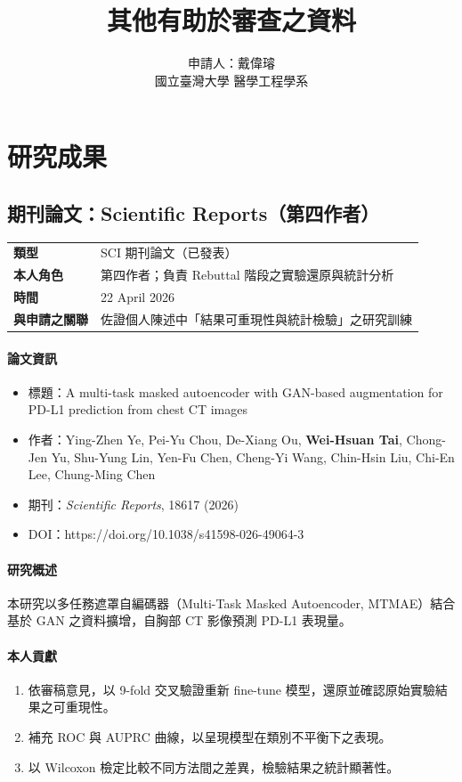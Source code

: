 \documentclass[12pt,a4paper]{article}
\title{\textbf{其他有助於審查之資料}\\[0.5em]}
\author{申請人：戴偉璿\\
國立臺灣大學 醫學工程學系}
\date{}
\newcommand{\itemsummary}[4]{%
\begin{center}
\begin{tabularx}{\linewidth}{>{\bfseries}l X}
\toprule
類型 & #1 \\
本人角色 & #2 \\
時間 & #3 \\
與申請之關聯 & #4 \\
\bottomrule
\end{tabularx}
\end{center}
}
\begin{document}
\maketitle
\thispagestyle{empty}

\newpage
\tableofcontents
\newpage

\section{研究成果}

\subsection{期刊論文：Scientific Reports（第四作者）}

\itemsummary
{SCI 期刊論文（已發表）}
{第四作者；負責 Rebuttal 階段之實驗還原與統計分析}
{22 April 2026}
{佐證個人陳述中「結果可重現性與統計檢驗」之研究訓練}

\paragraph{論文資訊}
\begin{itemize}[leftmargin=2em]
  \item 標題：A multi-task masked autoencoder with GAN-based augmentation for PD-L1 prediction from chest CT images
  \item 作者：Ying-Zhen Ye, Pei-Yu Chou, De-Xiang Ou, \textbf{Wei-Hsuan Tai}, Chong-Jen Yu, Shu-Yung Lin, Yen-Fu Chen, Cheng-Yi Wang, Chin-Hsin Liu, Chi-En Lee,  Chung-Ming Chen 
  \item 期刊：\textit{Scientific Reports}, 18617 (2026) 
  \item DOI：https://doi.org/10.1038/s41598-026-49064-3
\end{itemize}

\paragraph{研究概述}
本研究以多任務遮罩自編碼器（Multi-Task Masked Autoencoder, MTMAE）結合基於 GAN 之資料擴增，自胸部 CT 影像預測 PD-L1 表現量。

\paragraph{本人貢獻}
\begin{enumerate}[leftmargin=2em]
  \item 依審稿意見，以 9-fold 交叉驗證重新 fine-tune 模型，還原並確認原始實驗結果之可重現性。
  \item 補充 ROC 與 AUPRC 曲線，以呈現模型在類別不平衡下之表現。
  \item 以 Wilcoxon 檢定比較不同方法間之差異，檢驗結果之統計顯著性。
\end{enumerate}
\end{document}
